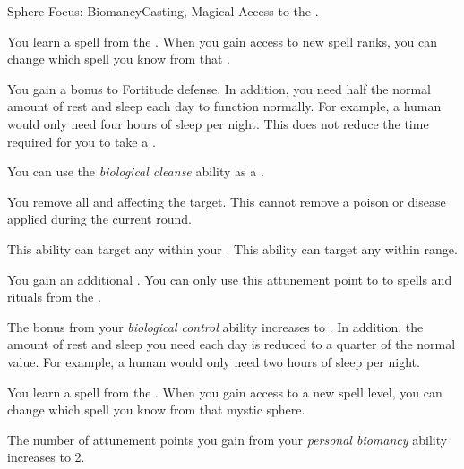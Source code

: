     \begin{feat}{Sphere Focus: Biomancy}{Casting, Magical}
        \featpre Access to the  .

         You learn a spell from the  .
        When you gain access to new spell ranks, you can change which spell you know from that .

         You gain a  bonus to Fortitude defense.
        In addition, you need half the normal amount of rest and sleep each day to function normally.
        For example, a human would only need four hours of sleep per night.
        This does not reduce the time required for you to take a .

         You can use the \textit{biological cleanse} ability as a .
        \begin{freeability}{}
            You remove all  and  affecting the target.
            This cannot remove a poison or disease applied during the current round.

            \rankline
             This ability can target any  within your .
             This ability can target any  within \rngmed range.
        \end{freeability}

         You gain an additional .
        You can only use this attunement point to  to spells and rituals from the  .

         The bonus from your \textit{biological control} ability increases to .
        In addition, the amount of rest and sleep you need each day is reduced to a quarter of the normal value.
        For example, a human would only need two hours of sleep per night.

         You learn a spell from the  .
        When you gain access to a new spell level, you can change which spell you know from that mystic sphere.

         The number of attunement points you gain from your \textit{personal biomancy} ability increases to 2.
    \end{feat}

